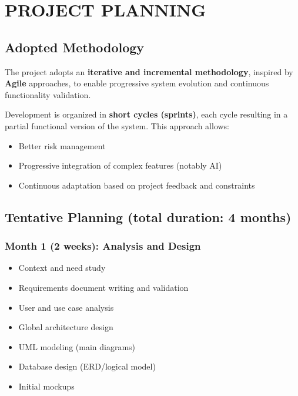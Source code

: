 \documentclass[12pt,a4paper]{article}
\begin{document}
\newpage

\newpage

\section{PROJECT PLANNING}

\subsection{Adopted Methodology}

The project adopts an \textbf{iterative and incremental methodology}, inspired by \textbf{Agile} approaches, to enable progressive system evolution and continuous functionality validation.

Development is organized in \textbf{short cycles (sprints)}, each cycle resulting in a partial functional version of the system. This approach allows:
\begin{itemize}
    \item Better risk management
    \item Progressive integration of complex features (notably AI)
    \item Continuous adaptation based on project feedback and constraints
\end{itemize}

\subsection{Tentative Planning (total duration: 4 months)}

\subsubsection{Month 1 (2 weeks): Analysis and Design}

\begin{itemize}
    \item Context and need study
    \item Requirements document writing and validation
    \item User and use case analysis
    \item Global architecture design
    \item UML modeling (main diagrams)
    \item Database design (ERD/logical model)
    \item Initial mockups
\end{itemize}
\end{document}
